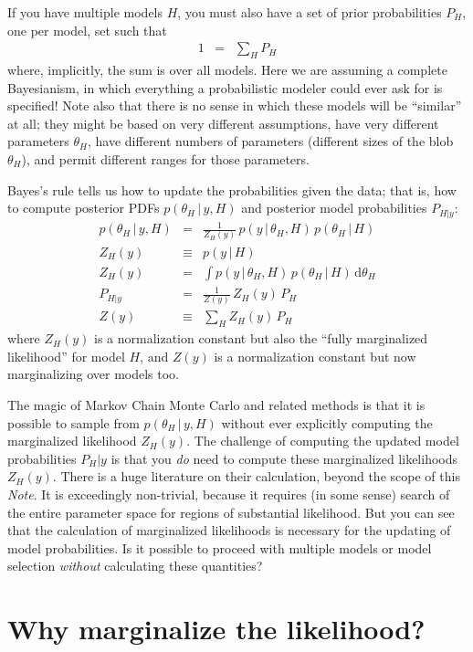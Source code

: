 \documentclass[12pt]{article}
\newcommand{\documentname}{\textsl{Note}}
\newcommand{\dd}{\mathrm{d}}
\newcommand{\given}{\,|\,}
\begin{document}
If you have multiple models $H$,
  you must also have a set of prior probabilities $P_H$, one per model,
  set such that
\begin{eqnarray}
1 &=& \sum_H P_H
\end{eqnarray}
where, implicitly,
the sum is over all models.
Here we are assuming a complete Bayesianism,
  in which everything a probabilistic modeler could ever ask for is specified!
Note also that there is no sense in which these models will be ``similar'' at all;
  they might be based on very different assumptions,
  have very different parameters $\theta_H$,
  have different numbers of parameters (different sizes of the blob $\theta_H$),
  and permit different ranges for those parameters.

Bayes's rule tells us how to update the probabilities given the data;
  that is, how to compute posterior PDFs $p(\theta_H\given y,H)$
  and posterior model probabilities $P_{H|y}$:
\begin{eqnarray}
p(\theta_H\given y,H) &=& \frac{1}{Z_H(y)}\,p(y\given\theta_H,H)\,p(\theta_H\given H)
\\
Z_H(y) &\equiv& p(y\given H)
\\
Z_H(y) &=& \int p(y\given\theta_H,H)\,p(\theta_H\given H)\,\dd\theta_H
\\
P_{H|y} &=& \frac{1}{Z(y)}\,Z_H(y)\,P_H
\\
Z(y) &\equiv& \sum_H Z_H(y)\,P_H
\end{eqnarray}
where
$Z_H(y)$ is a normalization constant
  but also the ``fully marginalized likelihood'' for model $H$, and
$Z(y)$ is a normalization constant but
  now marginalizing over models too.

The magic of Markov Chain Monte Carlo and related methods is that
  it is possible to sample from $p(\theta_H\given y,H)$ without ever explicitly computing
  the marginalized likelihood $Z_H(y)$.
The challenge of computing the updated model probabilities $P_H|y$
  is that you \emph{do} need to compute these marginalized likelihoods $Z_H(y)$.
There is a huge literature on their calculation, beyond the scope of this \documentname.
It is exceedingly non-trivial,
  because it requires (in some sense) search of the entire parameter space
  for regions of substantial likelihood.
But you can see that the calculation of marginalized likelihoods is necessary
  for the updating of model probabilities.
Is it possible to proceed with multiple models or model selection
  \emph{without} calculating these quantities?

\section{Why marginalize the likelihood?}
\end{document}
